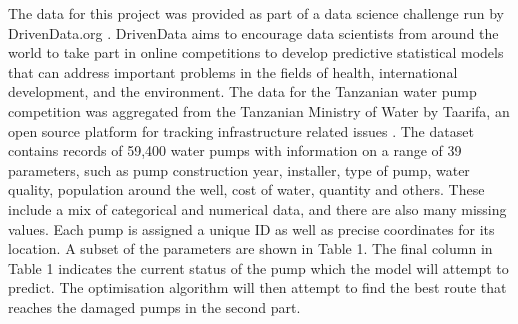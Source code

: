 \documentclass{article} %
\begin{document}
\begin{multicols}{2}
The data for this project was provided as part of a data science challenge run by DrivenData.org \cite{DrivenData2015}. DrivenData aims to encourage data scientists from around the world to take part in online competitions to develop predictive statistical models that can address important problems in the fields of health, international development, and the environment. The data for the Tanzanian water pump competition was aggregated from the Tanzanian Ministry of Water by Taarifa, an open source platform for tracking infrastructure related issues \cite{Taarifa2015}.  The dataset contains records of 59,400 water pumps with information on a range of 39 parameters, such as pump construction year, installer, type of pump, water quality, population around the well, cost of water, quantity and others. These include a mix of categorical and numerical data, and there are also many missing values. Each pump is assigned a unique ID as well as precise coordinates for its location. A subset of the parameters are shown in Table 1. The final column in Table 1 indicates the current status of the pump which the model will attempt to predict. The optimisation algorithm will then attempt to find the best route that reaches the damaged pumps in the second part.

\begin{table}
\caption{Sample of the DrivenData Tanzania water wells dataset}
\centering
{}
\end{table}



\end{multicols}
\end{document}
